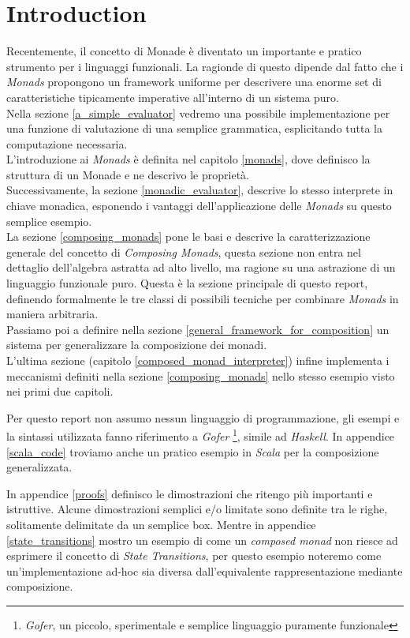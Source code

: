 \section{Introduction}

Recentemente, il concetto di Monade è diventato un importante e pratico
strumento per i linguaggi funzionali.
La ragionde di questo dipende dal fatto che i \textit{Monads} propongono un
framework uniforme per descrivere una enorme set di caratteristiche tipicamente
imperative all'interno di un sistema puro.\\
Nella sezione \ref{a_simple_evaluator} vedremo una possibile implementazione per
una funzione di valutazione di una semplice grammatica, esplicitando tutta la
computazione necessaria.\\
L'introduzione ai \textit{Monads} è definita nel capitolo \ref{monads}, dove
definisco la struttura di un Monade e ne descrivo le proprietà.\\
Successivamente, la sezione \ref{monadic_evaluator}, descrive lo stesso
interprete in chiave monadica, esponendo i vantaggi dell'applicazione delle
\textit{Monads} su questo semplice esempio.\\
La sezione \ref{composing_monads} pone le basi e descrive la caratterizzazione
generale del concetto di \textit{Composing Monads}, questa sezione non entra nel
dettaglio dell'algebra astratta ad alto livello, ma ragione su una astrazione
di un linguaggio funzionale puro. Questa è la sezione principale di questo
report, definendo formalmente le tre classi di possibili tecniche per combinare
\textit{Monads} in maniera arbitraria.\\
Passiamo poi a definire nella sezione \ref{general_framework_for_composition}
un sistema per generalizzare la composizione dei monadi.\\
L'ultima sezione (capitolo \ref{composed_monad_interpreter}) infine implementa
i meccanismi definiti nella sezione \ref{composing_monads} nello stesso esempio
visto nei primi due capitoli.\newline

Per questo report non assumo nessun linguaggio di programmazione, gli esempi e
la sintassi utilizzata fanno riferimento a \textit{Gofer}
\footnote{\textit{Gofer}, un piccolo, sperimentale e semplice linguaggio
puramente funzionale}, simile ad \textit{Haskell}.
In appendice \ref{scala_code} troviamo anche un pratico esempio in \textit{Scala} per la composizione
generalizzata.\newline

In appendice \ref{proofs} definisco le dimostrazioni che ritengo più importanti
e istruttive. Alcune dimostrazioni semplici e/o limitate sono definite tra le
righe, solitamente delimitate da un semplice box.
Mentre in appendice \ref{state_transitions} mostro un esempio di come un
\textit{composed monad} non riesce ad esprimere il concetto di
\textit{State Transitions}, per questo esempio noteremo come un'implementazione
ad-hoc sia diversa dall'equivalente rappresentazione mediante composizione.


\newpage